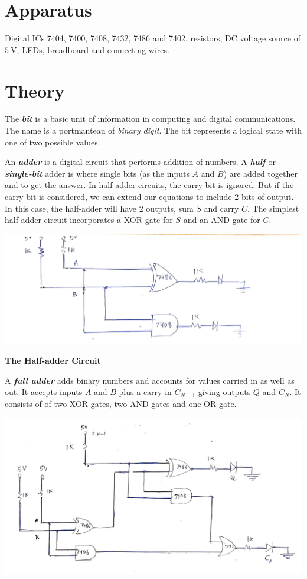 \section{Apparatus}
\noindent Digital ICs 7404, 7400, 7408, 7432, 7486 and 7402, resistors, DC voltage source of $\SI{5}{\volt}$, LEDs, breadboard and connecting wires.
\section{Theory}
\noindent
The \textbf{\emph{bit}} is a basic unit of information in computing and digital communications. The name is a portmanteau of \emph{binary digit}. The bit represents a logical state with one of two possible values.
\par
\noindent
An \textbf{\emph{adder}} is a digital circuit that performs addition of numbers. A \textbf{\emph{half}} or \textbf{\emph{single-bit}} adder is where single bits (as the inputs $A$ and $B$) are added together and to get the answer. In half-adder circuits, the carry bit is ignored. But if the carry bit is considered, we can extend our equations to include 2 bits of output. In this case, the half-adder will have 2 outputs, sum $S$ and carry $C$. The simplest half-adder circuit incorporates a XOR gate for $S$ and an AND gate for $C$.
\bigskip
\bigskip
\begin{center}
    \includegraphics[scale = 0.20]{halfadder_1.jpg}
\end{center}
\begin{center}
    \textbf{The Half-adder Circuit}
\end{center}
\clearpage
\noindent
A \textbf{\emph{full adder}} adds binary numbers and accounts for values carried in as well as out. It accepts inputs $A$ and $B$ plus a carry-in $C_{N-1}$ giving outputs $Q$ and $C_N$. It consists of of two XOR gates, two AND gates and one OR gate.
\begin{center}
    \includegraphics[scale = 0.2]{fulladder_1.jpg}
\end{center}
